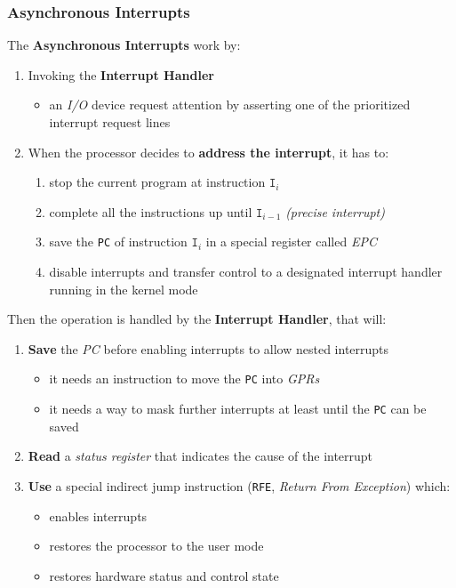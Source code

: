 \documentclass[english]{article}
\begin{document}
\subsubsection{Asynchronous Interrupts}

The \textbf{Asynchronous Interrupts} work by:

\begin{enumerate}
  \item Invoking the \textbf{Interrupt Handler}
        \begin{itemize}
          \item an \textit{I/O} device request attention by asserting one of the prioritized interrupt request lines
        \end{itemize}
  \item When the processor decides to \textbf{address the interrupt}, it has to:
        \begin{enumerate}[label=\arabic*.]
          \item stop the current program at instruction \(\texttt{I}_i\)
          \item complete all the instructions up until \(\texttt{I}_{i-1}\) \textit{(precise interrupt)}
          \item save the \texttt{PC} of instruction \(\texttt{I}_i\) in a special register called \textit{EPC}
          \item disable interrupts and transfer control to a designated interrupt handler running in the kernel mode
        \end{enumerate}
\end{enumerate}

Then the operation is handled by the \textbf{Interrupt Handler}, that will:

\begin{enumerate}[resume*]
  \item \textbf{Save} the \textit{PC} before enabling interrupts to allow nested interrupts
        \begin{itemize}
          \item it needs an instruction to move the \texttt{PC} into \textit{GPRs}
          \item it needs a way to mask further interrupts at least until the \texttt{PC} can be saved
        \end{itemize}
  \item \textbf{Read} a \textit{status register} that indicates the cause of the interrupt
  \item \textbf{Use} a special indirect jump instruction (\texttt{RFE}, \textit{Return From Exception}) which:
        \begin{itemize}
          \item enables interrupts
          \item restores the processor to the user mode
          \item restores hardware status and control state
        \end{itemize}
\end{enumerate}
\end{document}
